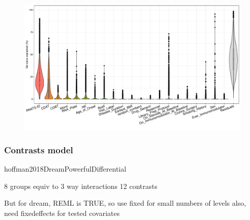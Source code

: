 \begin{outline}


\begin{figure}
    \centering
    \includegraphics[width=1.0\textwidth,page=1]{mainmatter/figures/chapter_04/dream.plotVarPart.pdf}
    \caption{}
    \label{fig:multipants_varPart}
\end{figure}

\subsubsection{Contrasts model}

 hoffman2018DreamPowerfulDifferential

8 groups equiv to 3 way interactions
12 contrasts

But for dream, 
REML is TRUE, so use fixed for small numbers of levels
also, need fixedeffects for tested covariates


\end{outline}
